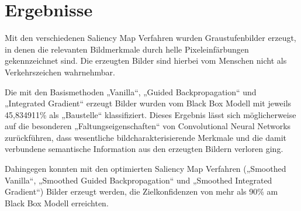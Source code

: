 \section{Ergebnisse}
\label{sec:SalErgebnisse}
Mit den verschiedenen Saliency Map Verfahren wurden Graustufenbilder erzeugt, in denen die relevanten Bildmerkmale durch helle Pixeleinfärbungen gekennzeichnet sind. 
Die erzeugten Bilder sind hierbei vom Menschen nicht als Verkehrszeichen wahrnehmbar.


Die mit den Basismethoden „Vanilla“, „Guided Backpropagation“ und „Integrated Gradient“ erzeugt Bilder wurden vom Black Box Modell mit jeweils 45,834911\% als „Baustelle“ klassifiziert.
Dieses Ergebnis lässt sich möglicherweise auf die besonderen „Faltungseigenschaften“ von Convolutional Neural Networks zurückführen, dass wesentliche bildcharakterisierende Merkmale und die damit verbundene semantische Information aus den erzeugten Bildern verloren ging.


Dahingegen konnten mit den optimierten Saliency Map Verfahren („Smoothed Vanilla“, „Smoothed Guided Backpropagation“ und „Smoothed Integrated Gradient“) Bilder erzeugt werden, die Zielkonfidenzen von mehr als 90\% am Black Box Modell erreichten.

%
%

